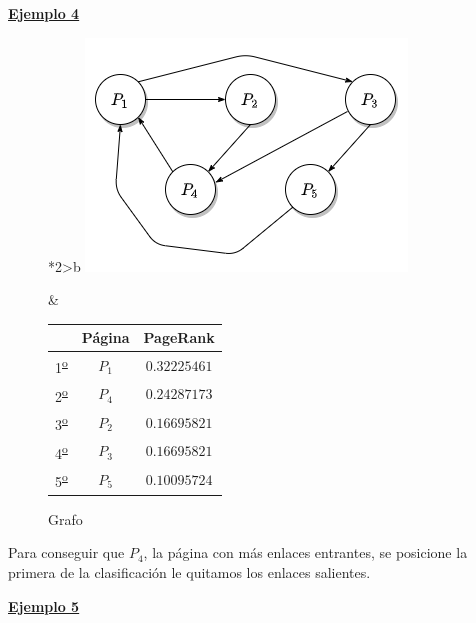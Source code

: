 \documentclass[size=a4, parskip=half, titlepage=false, toc=flat, toc=bib, 12pt]{scrartcl}
\theoremstyle{theorem-style}
\theoremstyle{definition-style}
\theoremstyle{remark-style}
\theoremstyle{example-style}
\theoremstyle{definition-style}
\theoremstyle{remark-style}
\begin{document}
\underline{\textbf{Ejemplo 4}}

\begin{figure}[!ht]
  \begin{tabular}{*{2}{>{\centering\arraybackslash}b{}}}
  \centering
    \includegraphics[scale=0.5]{./img/grafoej4}
    \caption{Grafo}
    &
      \renewcommand{\arraystretch}{1.3}
      \begin{tabular}{ccc}
        & Página & PageRank     \\ \hline
      1\textsuperscript{\underline{o}}} & $P_1$  & $0.32225461$ \\ \hline
      2\textsuperscript{\underline{o}}} & $P_4$  & $0.24287173$ \\ \hline
      3\textsuperscript{\underline{o}}} & $P_2$  & $0.16695821$ \\ \hline
      4\textsuperscript{\underline{o}}} & $P_3$  & $0.16695821$ \\ \hline
      5\textsuperscript{\underline{o}}} & $P_5$  & $0.10095724$ \\ \hline
      \end{tabular}
    \end{tabular}
\end{figure}

\newpage

Para conseguir que $P_4$, la página con más enlaces entrantes, se posicione la primera de la clasificación le quitamos los enlaces salientes.

\underline{\textbf{Ejemplo 5}}
\end{document}
